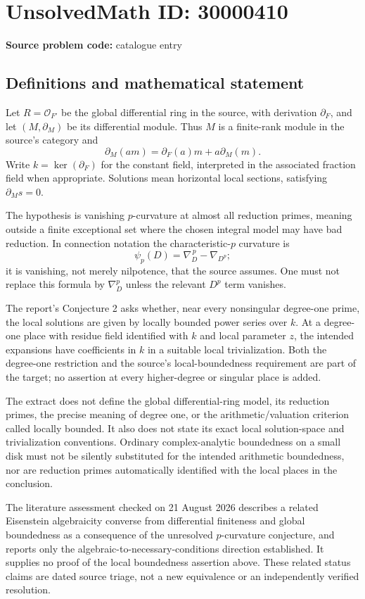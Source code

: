 \documentclass[11pt]{article}
\begin{document}
\section*{UnsolvedMath ID: 30000410}
\textbf{Source problem code:} catalogue entry
\subsection{Definitions and mathematical statement}
Let $R=\mathcal O_{F'}$ be the global differential ring in the source, with derivation $\partial_F$, and let $(M,\partial_M)$ be its differential module. Thus $M$ is a finite-rank module in the source's category and
\[
 \partial_M(am)=\partial_F(a)m+a\partial_M(m).
\]
Write $k=\ker(\partial_F)$ for the constant field, interpreted in the associated fraction field when appropriate. Solutions mean horizontal local sections, satisfying $\partial_M s=0$.

The hypothesis is vanishing $p$-curvature at almost all reduction primes, meaning outside a finite exceptional set where the chosen integral model may have bad reduction. In connection notation the characteristic-$p$ curvature is
\[
 \psi_p(D)=\nabla_D^{\,p}-\nabla_{D^p};
\]
it is vanishing, not merely nilpotence, that the source assumes. One must not replace this formula by $\nabla_D^p$ unless the relevant $D^p$ term vanishes.

The report's Conjecture 2 asks whether, near every nonsingular degree-one prime, the local solutions are given by locally bounded power series over $k$. At a degree-one place with residue field identified with $k$ and local parameter $z$, the intended expansions have coefficients in $k$ in a suitable local trivialization. Both the degree-one restriction and the source's local-boundedness requirement are part of the target; no assertion at every higher-degree or singular place is added.

The extract does not define the global differential-ring model, its reduction primes, the precise meaning of degree one, or the arithmetic/valuation criterion called locally bounded. It also does not state its exact local solution-space and trivialization conventions. Ordinary complex-analytic boundedness on a small disk must not be silently substituted for the intended arithmetic boundedness, nor are reduction primes automatically identified with the local places in the conclusion.

The literature assessment checked on 21 August 2026 describes a related Eisenstein algebraicity converse from differential finiteness and global boundedness as a consequence of the unresolved $p$-curvature conjecture, and reports only the algebraic-to-necessary-conditions direction established. It supplies no proof of the local boundedness assertion above. These related status claims are dated source triage, not a new equivalence or an independently verified resolution.
\end{document}
